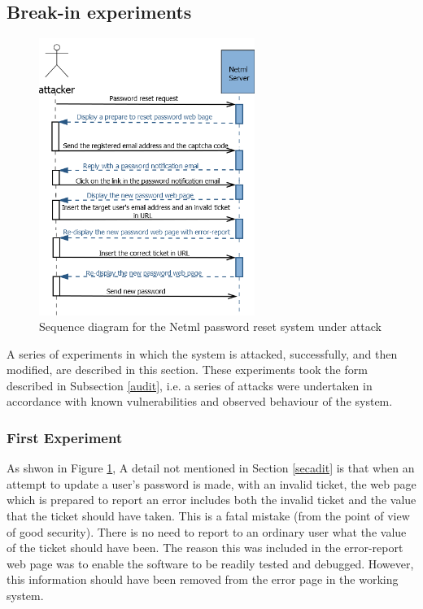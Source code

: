 \subsection{Break-in experiments}\label{brkexpts}
\begin{figure}
	\centering
		\includegraphics[width=7cm]{figures/attacker.png}
\caption{Sequence diagram for the Netml password reset  system under attack }
\label{seqdgnetmlattack}
\end{figure}
A series of experiments in which the system is attacked,
successfully, and then modified, are described in this section.
These experiments took the form described in Subsection \ref{audit},
i.e. a series of attacks were undertaken in accordance with known
vulnerabilities and observed behaviour of the system.

\subsubsection{First Experiment}
As shwon in Figure \ref{seqdgnetmlattack}, A detail not mentioned in Section \ref{secadit} is that when an attempt
to update a user's password is made, with an invalid ticket, the web 
page which is prepared to report an error includes both the invalid
ticket and the value that the ticket should have taken. This is a fatal
mistake (from the point of view of good security). There is no need
to report to an ordinary user what the value of the ticket should
have been. The reason this was included in the error-report web page
was to enable the software to be readily tested and debugged. However,
this information should have been removed from the error page
in the working system.

